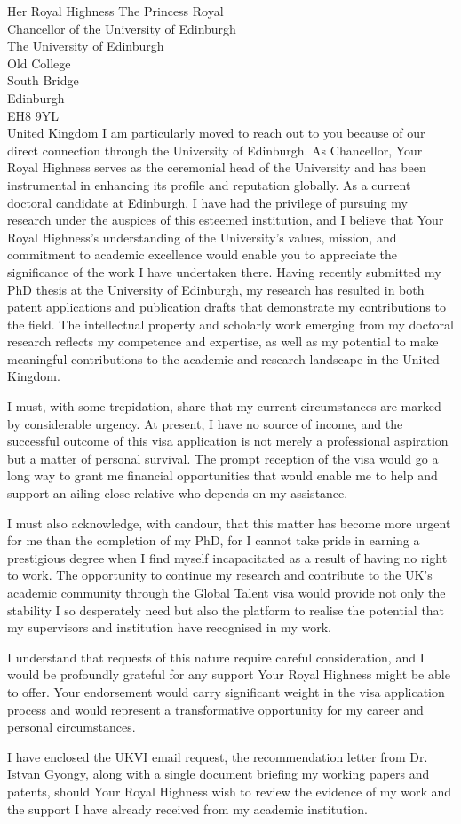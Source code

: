 \documentclass[12pt,a4paper]{letter}
\begin{document}
\begin{letter}{Her Royal Highness The Princess Royal\\Chancellor of the University of Edinburgh\\The University of Edinburgh\\Old College\\South Bridge\\Edinburgh\\EH8 9YL\\United Kingdom}
I am particularly moved to reach out to you because of our direct connection through the University of Edinburgh. As Chancellor, Your Royal Highness serves as the ceremonial head of the University and has been instrumental in enhancing its profile and reputation globally. As a current doctoral candidate at Edinburgh, I have had the privilege of pursuing my research under the auspices of this esteemed institution, and I believe that Your Royal Highness's understanding of the University's values, mission, and commitment to academic excellence would enable you to appreciate the significance of the work I have undertaken there. Having recently submitted my PhD thesis at the University of Edinburgh, my research has resulted in both patent applications and publication drafts that demonstrate my contributions to the field. The intellectual property and scholarly work emerging from my doctoral research reflects my competence and expertise, as well as my potential to make meaningful contributions to the academic and research landscape in the United Kingdom.

I must, with some trepidation, share that my current circumstances are marked by considerable urgency. At present, I have no source of income, and the successful outcome of this visa application is not merely a professional aspiration but a matter of personal survival. The prompt reception of the visa would go a long way to grant me financial opportunities that would enable me to help and support an ailing close relative who depends on my assistance. 

I must also acknowledge, with candour, that this matter has become more urgent for me than the completion of my PhD, for I cannot take pride in earning a prestigious degree when I find myself incapacitated as a result of having no right to work. The opportunity to continue my research and contribute to the UK's academic community through the Global Talent visa would provide not only the stability I so desperately need but also the platform to realise the potential that my supervisors and institution have recognised in my work.

I understand that requests of this nature require careful consideration, and I would be profoundly grateful for any support Your Royal Highness might be able to offer. Your endorsement would carry significant weight in the visa application process and would represent a transformative opportunity for my career and personal circumstances.

I have enclosed the UKVI email request, the recommendation letter from Dr. Istvan Gyongy, along with a single document briefing my working papers and patents, should Your Royal Highness wish to review the evidence of my work and the support I have already received from my academic institution.


\end{letter}
\end{document}
